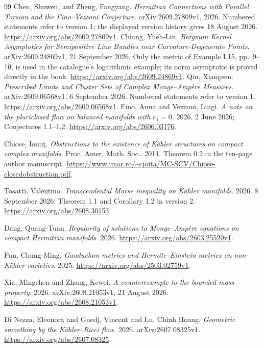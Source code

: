 \documentclass[11pt]{article}
\begin{document}
\begin{thebibliography}{99}
 Chen, Shuwen, and Zheng, Fangyang. \emph{Hermitian Connections with Parallel Torsion and the Fino--Vezzoni Conjecture}. arXiv:2609.27809v1, 2026. Numbered statements refer to version 1; the displayed version history gives 18 August 2026. \url{https://arxiv.org/abs/2609.27809v1}.
 Chiang, Yueh-Lin. \emph{Bergman Kernel Asymptotics for Semipositive Line Bundles near Curvature-Degenerate Points}. arXiv:2609.24869v1, 21 September 2026. Only the metric of Example I.15, pp.~9--10, is used in the catalogue's logarithmic example; its norm asymptotic is proved directly in the book. \url{https://arxiv.org/abs/2609.24869v1}.
 Qin, Xiangsen. \emph{Prescribed Limits and Cluster Sets of Complex Monge--Amp\`ere Measures}. arXiv:2609.06568v1, 6 September 2026. Numbered statements refer to version 1. \url{https://arxiv.org/abs/2609.06568v1}.
 Fino, Anna and Vezzoni, Luigi. \emph{A note on the pluriclosed flow on balanced manifolds with {$c_1=0$}}. 2026. 2 June 2026; Conjectures 1.1--1.2. \url{https://arxiv.org/abs/2606.03176}.

 Chiose, Ionu{\c t}. \emph{Obstructions to the existence of {K\"ahler} structures on compact complex manifolds}. Proc. Amer. Math. Soc.. 2014. Theorem 0.2 in the ten-page author manuscript. \url{https://www.imar.ro/~cjoita/MC-SCV/Chiose-closedobstruction.pdf}.

 Tosatti, Valentino. \emph{Transcendental {Morse} inequality on {K\"ahler} manifolds}. 2026. 8 September 2026; Theorem 1.1 and Corollary 1.2 in version 2. \url{https://arxiv.org/abs/2608.30153}.

 Dang, Quang-Tuan. \emph{Regularity of solutions to {Monge--Amp\`ere} equations on compact {Hermitian} manifolds}. 2026. \url{https://arxiv.org/abs/2603.25520v1}.

 Pan, Chung-Ming. \emph{Gauduchon metrics and {Hermite--Einstein} metrics on non-{K\"ahler} varieties}. 2025. \url{https://arxiv.org/abs/2503.02759v1}.

 Xia, Mingchen and Zhang, Kewei. \emph{A counterexample to the bounded mass property}. 2026. arXiv:2608.21053v1, 21 August 2026. \url{https://arxiv.org/abs/2608.21053v1}.

 Di Nezza, Eleonora and Guedj, Vincent and Lu, Chinh Hoang. \emph{Geometric smoothing by the {K\"ahler--Ricci} flow}. 2026. arXiv:2607.08325v1. \url{https://arxiv.org/abs/2607.08325}.


\end{thebibliography}
\end{document}
